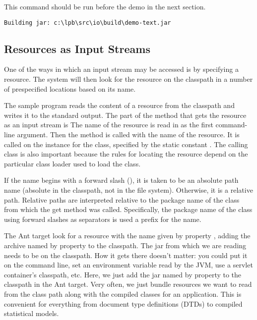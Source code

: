 This command should be run before the demo in the next section.
%
\begin{verbatim}
Building jar: c:\lpb\src\io\build\demo-text.jar
\end{verbatim}


\subsection{Resources as Input Streams}\label{section:io-resource-input}

One of the ways in which an input stream may be accessed is by
specifying a resource.  The system will then look for the resource on
the classpath in a number of prespecified locations based on its name.

The sample program  reads the content of a
resource from the classpath and writes it to the standard output.
The part of the  method that gets the resource as
an input stream is
%
%
The name of the resource is read in as the first command-line
argument.  Then the method  is
called with the name of the resource.  It is called on the
 instance for the  class, specified by
the static constant .  The calling class is
also important because the rules for locating the resource depend on
the particular class loader used to load the class.

If the name begins with a forward slash (\code{/}), it is taken to be
an absolute path name (absolute in the classpath, not in the file
system).  Otherwise, it is a relative path.  Relative paths are
interpreted relative to the package name of the class from which the
get method was called.  Specifically, the package name of the class
using forward slashes as separators is used a prefix for the name.

The Ant target  look for a resource with the name
given by property , adding the archive named by
property  to the classpath.  The jar from which we
are reading needs to be on the classpath.  How it gets there doesn't
matter: you could put it on the command line, set an environment
variable read by the JVM, use a servlet container's classpath, etc.
Here, we just add the jar named by property  to the
classpath in the Ant target.  Very often, we just bundle resources
we want to read from the class path along with the compiled classes
for an application.  This is convenient for everything from document
type definitions (DTDs) to compiled statistical models.

